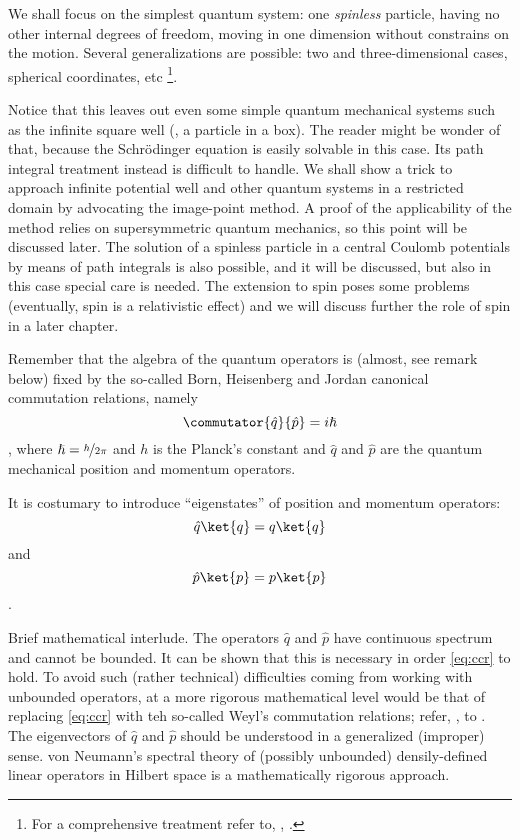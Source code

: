 We shall focus on  the simplest quantum system: one
\emph{spinless} particle, having no other internal
degrees of freedom, moving in one dimension without constrains on the motion.
Several generalizations are possible: two and three-dimensional cases,
spherical 
coordinates, etc%
\footnote{For a comprehensive treatment refer to, \eg,
   \cite{Grosche.Steiner:1998,Kleinert:2009}.}.
\begin{approfondimento}
   Notice that this leaves out even some simple quantum mechanical systems such as the
   infinite square well (\ie, a particle in a box).
   The reader might be wonder of that, because the Schr\"odinger equation 
   is easily solvable in this case.
   Its path integral treatment instead is difficult to handle. 
   We shall show a trick to approach infinite potential well and other quantum
   systems in a restricted domain by
   advocating the image-point method. A proof of the applicability of the
   method relies on
   supersymmetric quantum mechanics, so this point will be discussed later.
   The solution of a spinless particle in a central Coulomb potentials by means
   of path integrals is also possible, and it will be discussed, but also in
   this case special care is needed.
   The extension to spin poses some problems (eventually, spin is a
   relativistic effect) and we will discuss further the role of spin in a later
   chapter.
\end{approfondimento}


Remember that the algebra of the quantum
operators is (almost, see remark below) fixed by  the so-called Born, Heisenberg
and Jordan canonical commutation relations, namely
\begin{dmath}[label={ccr}]
   \commutator{\hat{q}}{\hat{p}}= i\hslash 
\end{dmath},
where $\hslash = \nicefrac{h}{2\pi}$ and $h$ is the Planck's constant and
$\hat{q}$ and $\hat{p}$ are the quantum mechanical position and momentum
operators.

It is costumary to introduce ``eigenstates'' of position and momentum operators:
\begin{dmath*}
   \hat{q} \ket{q} = q \ket{q} 
\end{dmath*}
and
\begin{dmath*}
   \hat{p} \ket{p} = p \ket{p} 
\end{dmath*}.
\begin{approfondimento}
   Brief mathematical interlude.
   The operators $\hat{q}$ and
$\hat{p}$ have continuous spectrum and cannot be bounded. It can be shown that
this is necessary in order 
\cref{eq:ccr} to hold.
To avoid such (rather technical)
difficulties coming from working with unbounded operators, at a more rigorous
mathematical 
level would be that of replacing \cref{eq:ccr} with teh so-called 
Weyl's commutation relations; refer, \eg, to \cite{Zeidler:2009c}.
The eigenvectors of $\hat{q}$ and $\hat{p}$ should be understood in a
generalized (improper) sense. 
von Neumann's spectral theory of (possibly unbounded) densily-defined linear
operators in Hilbert space is a mathematically rigorous approach.
\end{approfondimento}


